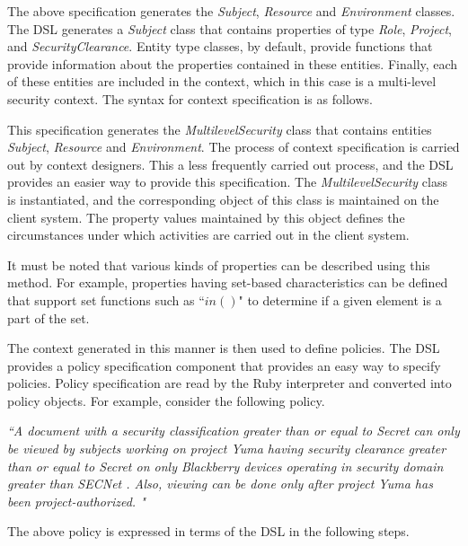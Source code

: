 

The above specification generates the {\em Subject}, {\em Resource} and {\em Environment} classes. The DSL generates a {\em Subject} class that contains properties of type {\em Role}, {\em Project}, and {\em SecurityClearance}. Entity type classes, by default, provide functions that provide information about the  properties contained in these entities. Finally, each of these entities are included in the context, which in this case is a multi-level security context. The syntax for context specification is as follows. 



This specification generates the {\em MultilevelSecurity} class that contains entities {\em Subject}, {\em Resource} and {\em Environment}. The process of context specification is carried out by context designers. This a less frequently carried out process, and the DSL provides an easier way to provide this specification. The {\em MultilevelSecurity} class is instantiated, and the corresponding object of this class is maintained on the client system. The property values maintained by this object defines the circumstances under which activities are carried out in the client system. 

It must be noted that various kinds of properties can be described using this method. For example, properties having set-based characteristics can be defined that support set functions such as ``$in()$" to determine if a given element is a part of the set. 

The context generated in this manner is then used to define policies. The DSL provides a policy specification component that provides an easy way to specify policies. Policy specification are read by the Ruby interpreter and converted into policy objects. For example, consider the following policy. 

{\em ``A document with a security classification greater than or equal to Secret can only be viewed by subjects working on project Yuma having security clearance greater than or equal to Secret on only Blackberry devices operating in security domain greater than SECNet . Also, viewing can be done only after project Yuma has been project-authorized. "}

The above policy is expressed in terms of the DSL in the following steps. 



